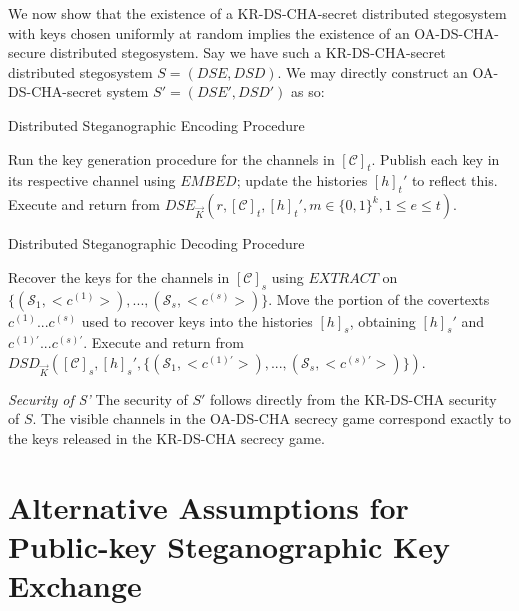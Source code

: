 \documentclass{article}
\begin{document}
We now show that the existence of a KR-DS-CHA-secret distributed stegosystem with keys chosen uniformly at random 
implies the existence of an OA-DS-CHA-secure distributed stegosystem.
\newline\newline
Say we have such a KR-DS-CHA-secret distributed stegosystem $S=(DSE,DSD)$.  We may directly construct an 
OA-DS-CHA-secret system $S'=(DSE',DSD')$ as so:

\begin{algorithm}[H]
\caption{Distributed Steganographic Encoding Procedure}\label{1a}
\begin{algorithmic}[1]
\State Run the key generation procedure for the channels in $[\mathcal{C}]_t$.
\State Publish each key in its respective channel using $EMBED$; update the histories $[h]_t'$ to reflect this.
\State Execute and return from $DSE_{\vec{K}}(r, [\mathcal{C}]_t, [h]_t', m \in \{0,1\}^k, 1 \leq e \leq t)$.
\EndProcedure
\end{algorithmic}
\end{algorithm}

\begin{algorithm}[H]
\caption{Distributed Steganographic Decoding Procedure}\label{1a}
\begin{algorithmic}[1]
\State Recover the keys for the channels in $[\mathcal{C}]_s$ using $EXTRACT$ on $\{ (\mathcal{S}_1, <c^{(1)}>), ..., (\mathcal{S}_s, <c^{(s)}>) \}$.
\State Move the portion of the covertexts $c^{(1)}...c^{(s)}$ used to recover keys into the histories $[h]_s$, obtaining 
\State $[h]_s'$ and $c^{(1)'}...c^{(s)'}$.
\State Execute and return from $DSD_{\vec{K}}([\mathcal{C}]_s, [h]_s', \{ (\mathcal{S}_1, <c^{(1)'}>), ..., (\mathcal{S}_s, <c^{(s)'}>) \})$.
\EndProcedure
\end{algorithmic}
\end{algorithm}

\noindent \textit{Security of S' } The security of $S'$ follows directly from the KR-DS-CHA security of $S$.  
The visible channels in the OA-DS-CHA secrecy game correspond exactly to the keys released in the KR-DS-CHA secrecy game.


\section{Alternative Assumptions for Public-key Steganographic Key Exchange}
\end{document}
